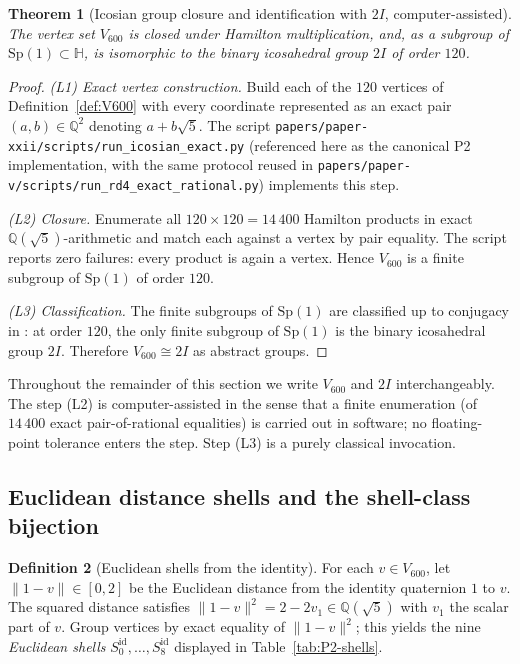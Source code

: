 \documentclass[11pt, a4paper]{amsart}
\newtheorem{theorem}{Theorem}[section]
\theoremstyle{definition}
\newtheorem{definition}[theorem]{Definition}
\newcommand{\Q}{\mathbb{Q}}
\newcommand{\HH}{\mathbb{H}}
\begin{document}
\begin{theorem}[Icosian group closure and identification with $2I$,
computer-assisted]
\label{thm:icosian-closure}
The vertex set $V_{600}$ is closed under Hamilton multiplication,
and, as a subgroup of $\mathrm{Sp}(1) \subset \HH$, is isomorphic
to the binary icosahedral group $2I$ of order $120$.
\end{theorem}

\begin{proof}
\emph{(L1) Exact vertex construction.} Build each of the $120$
vertices of Definition~\ref{def:V600} with every coordinate
represented as an exact pair $(a, b) \in \Q^2$ denoting $a +
b\sqrt 5$. The script
\verb|papers/paper-xxii/scripts/run_icosian_exact.py| (referenced
here as the canonical P2 implementation, with the same protocol
reused in
\verb|papers/paper-v/scripts/run_rd4_exact_rational.py|) implements
this step.

\emph{(L2) Closure.} Enumerate all $120 \times 120 = 14\,400$
Hamilton products in exact $\Q(\sqrt 5)$-arithmetic and match each
against a vertex by pair equality. The script reports zero
failures: every product is again a vertex. Hence $V_{600}$ is a
finite subgroup of $\mathrm{Sp}(1)$ of order $120$.

\emph{(L3) Classification.} The finite subgroups of
$\mathrm{Sp}(1)$ are classified up to conjugacy in
\cite[Ch.~3]{DuVal1964}: at order $120$, the only finite subgroup
of $\mathrm{Sp}(1)$ is the binary icosahedral group $2I$.
Therefore $V_{600} \cong 2I$ as abstract groups.
\end{proof}

Throughout the remainder of this section we write $V_{600}$ and
$2I$ interchangeably. The step (L2) is computer-assisted in the
sense that a finite enumeration (of $14\,400$ exact pair-of-rational
equalities) is carried out in software; no floating-point
tolerance enters the step. Step (L3) is a purely classical
invocation.

\subsection{Euclidean distance shells and the shell-class bijection}
\label{sec:shells-classes}

\begin{definition}[Euclidean shells from the identity]
\label{def:shells}
For each $v \in V_{600}$, let $\|1 - v\| \in [0, 2]$ be the
Euclidean distance from the identity quaternion $1$ to $v$. The
squared distance satisfies $\|1 - v\|^2 = 2 - 2 v_1 \in
\Q(\sqrt 5)$ with $v_1$ the scalar part of $v$. Group vertices by
exact equality of $\|1 - v\|^2$; this yields the nine \emph{Euclidean
shells} $S_0^{\mathrm{id}}, \ldots, S_8^{\mathrm{id}}$ displayed in
Table~\ref{tab:P2-shells}.
\end{definition}
\end{document}
